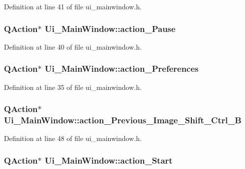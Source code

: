 Definition at line 41 of file ui\_\-mainwindow.h.

\hypertarget{classUi__MainWindow_a0c7d1b72703df51a22fba67c15a31e8b}{
\subsubsection[{action\_\-Pause}]{\setlength{\rightskip}{0pt plus 5cm}QAction$\ast$ {\bf Ui\_\-MainWindow::action\_\-Pause}}}
\label{classUi__MainWindow_a0c7d1b72703df51a22fba67c15a31e8b}


Definition at line 40 of file ui\_\-mainwindow.h.

\hypertarget{classUi__MainWindow_a0c698e3df44548c69ba5d38d50402d32}{
\subsubsection[{action\_\-Preferences}]{\setlength{\rightskip}{0pt plus 5cm}QAction$\ast$ {\bf Ui\_\-MainWindow::action\_\-Preferences}}}
\label{classUi__MainWindow_a0c698e3df44548c69ba5d38d50402d32}


Definition at line 35 of file ui\_\-mainwindow.h.

\hypertarget{classUi__MainWindow_a109a2b59e51d886849f706bf6ff4a13d}{
\subsubsection[{action\_\-Previous\_\-Image\_\-Shift\_\-Ctrl\_\-B}]{\setlength{\rightskip}{0pt plus 5cm}QAction$\ast$ {\bf Ui\_\-MainWindow::action\_\-Previous\_\-Image\_\-Shift\_\-Ctrl\_\-B}}}
\label{classUi__MainWindow_a109a2b59e51d886849f706bf6ff4a13d}


Definition at line 48 of file ui\_\-mainwindow.h.

\hypertarget{classUi__MainWindow_ae338c30b4948a2301c9b166b4f384671}{
\subsubsection[{action\_\-Start}]{\setlength{\rightskip}{0pt plus 5cm}QAction$\ast$ {\bf Ui\_\-MainWindow::action\_\-Start}}}
\label{classUi__MainWindow_ae338c30b4948a2301c9b166b4f384671}


